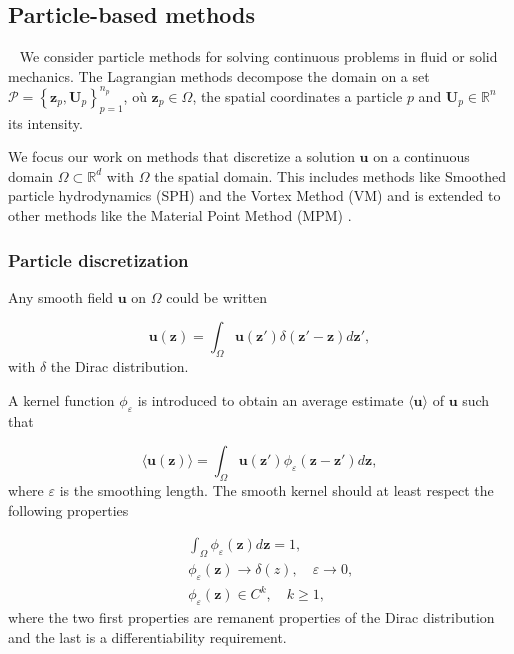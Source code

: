 
\subsection{Particle-based methods}~\label{Background_Part}
We consider particle methods for solving continuous problems in fluid or solid mechanics. The Lagrangian methods decompose the domain on a set $\mathcal P = \left\{\bm z_p, \bm U_p\right\}_{p = 1}^{n_p}$, où $\bm z_p \in \Omega$, the spatial coordinates a particle $p$ and $\bm U_p \in \mathbb{R}^n$ its intensity.


We focus our work on methods that discretize a solution $\bm u$ on a continuous domain $\Omega \subset \mathbb{R}^d$ with $\Omega$ the spatial domain. This includes methods like Smoothed particle hydrodynamics (SPH) \cite{gingold_monaghan_sph_1977,lucy_1977} and the Vortex Method (VM) \cite{cottet_vortex_2000} and is extended to other methods like the Material Point Method (MPM) \cite{sulsky_particle_1994}.

\subsubsection{Particle discretization}

Any smooth field $\bm u$ on $\Omega$ could be written

\begin{equation*}
	\bm u(\bm z) = \int_{\Omega} \bm u(\bm z') \delta(\bm z' - \bm z)  d\bm z',
\end{equation*}with $\delta$ the Dirac distribution.

A kernel function $\phi_\varepsilon$ is introduced to obtain an average estimate $\langle \bm u \rangle$ of $\bm u$ such that

\begin{equation*}
	\langle \bm u(\bm z) \rangle = \int_{\Omega} \bm u(\bm z') \phi_\varepsilon(\bm z-\bm z') d\bm z,
\end{equation*}where $\varepsilon$ is the smoothing length. The smooth kernel should at least respect the following properties

\begin{eqnarray*}
	&& \int_{\Omega} \phi_\varepsilon(\bm z) d\bm z = 1,      \\
	&& \phi_\varepsilon(\bm z) \to \delta(z), \quad \varepsilon \to 0, \\
	&& \phi_\varepsilon(\bm z) \in C^k,  \quad k \geq 1,
\end{eqnarray*} where the two first properties are remanent properties of the Dirac distribution and the last is a differentiability requirement.


